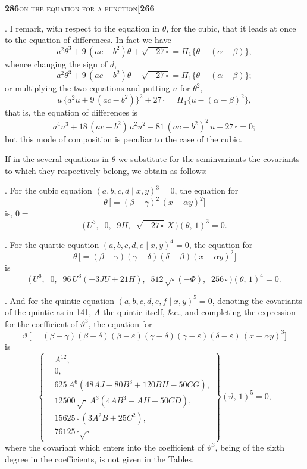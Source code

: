 \documentclass[11pt]{article}
\newcommand{\Cdel}{\mid}
\begin{document}
\newpage
\setcounter{page}{286}

\noindent\textbf{286}\hfill\textsc{on the equation for a function}\hfill\textbf{[266}

\medskip

. I remark, with respect to the equation in $\theta$, for the cubic, that it leads at once to the equation of differences. In fact we have
\[
   a^2\theta^3 + 9\,(ac - b^2)\theta + \sqrt{-\,27\,\square} = \Pi_1\!\bigl\{\theta - (\alpha - \beta)\bigr\},
\]
whence changing the sign of $d$,
\[
   a^2\theta^3 + 9\,(ac - b^2)\theta - \sqrt{-\,27\,\square} = \Pi_1\!\bigl\{\theta + (\alpha - \beta)\bigr\};
\]
or multiplying the two equations and putting $u$ for $\theta^2$,
\[
   u\,\bigl\{a^2 u + 9\,(ac - b^2)\bigr\}^2 + 27\,\square = \Pi_1\!\bigl\{u - (\alpha - \beta)^2\bigr\},
\]
that is, the equation of differences is
\[
   a^4 u^3 + 18\,(ac - b^2)\,a^2 u^2 + 81\,(ac - b^2)^2\,u + 27\,\square = 0;
\]
but this mode of composition is peculiar to the case of the cubic.

\medskip

\noindent If in the several equations in $\theta$ we substitute for the seminvariants the covariants to which they respectively belong, we obtain as follows:

\medskip

. For the cubic equation $(a, b, c, d \Cdel x, y)^3 = 0$, the equation for
\[
   \theta\,\bigl[=(\beta - \gamma)^2\,(x - \alpha y)^2\bigr]
\]
is, $0 =$
\[
\bigl(\,U^3,\;\; 0,\;\; 9 H,\;\; \sqrt{-\,27\,\square}\,X\,\bigr)(\theta,\,1)^3 = 0.
\]

\medskip

. For the quartic equation $(a, b, c, d, e \Cdel x, y)^4 = 0$, the equation for
\[
   \theta\,\bigl[=(\beta - \gamma)(\gamma - \delta)(\delta - \beta)(x - \alpha y)^2\bigr]
\]
is
\[
\bigl(\,U^6,\;\; 0,\;\; 96\,U^3(-3JU+21H),\;\; 512\,\sqrt{\square}(-\Phi),\;\; 256\,\square\,\bigr)(\theta,\,1)^4 = 0.
\]

\medskip

. And for the quintic equation $(a, b, c, d, e, f \Cdel x, y)^5 = 0$, denoting the covariants of the quintic as in 141, $A$ the quintic itself, \&c., and completing the expression for the coefficient of $\vartheta^3$, the equation for
\[
   \vartheta\,\bigl[=(\beta - \gamma)(\beta - \delta)(\beta - \varepsilon)(\gamma - \delta)(\gamma - \varepsilon)(\delta - \varepsilon)\,(x - \alpha y)^3\bigr]
\]
is
\[
\left\{
\begin{aligned}
   & A^{12},\\
   & 0,\\
   & 625\,A^6(48AJ - 80B^3 + 120BH - 50CG),\\
   & 12500\,\sqrt{\square}\,A^3(4AB^3 - AH - 50CD),\\
   & 15625\,\square\,(3A^2B + 25C^2),\\
   & 76125\,\square\sqrt{\square}
\end{aligned}
\right\}(\vartheta,\,1)^5 = 0,
\]
where the covariant which enters into the coefficient of $\vartheta^3$, being of the sixth degree in the coefficients, is not given in the Tables.
\end{document}
